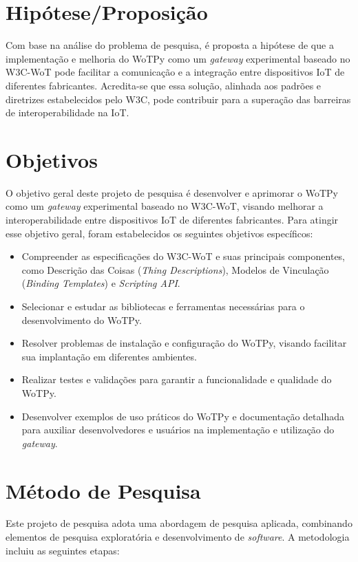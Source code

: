 \section{Hipótese/Proposição}

Com base na análise do problema de pesquisa, é proposta a hipótese de que a implementação e melhoria do WoTPy como um \textit{gateway} experimental baseado no W3C-WoT pode facilitar a comunicação e a integração entre dispositivos IoT de diferentes fabricantes. Acredita-se que essa solução, alinhada aos padrões e diretrizes estabelecidos pelo W3C, pode contribuir para a superação das barreiras de interoperabilidade na IoT.

\section{Objetivos}

O objetivo geral deste projeto de pesquisa é desenvolver e aprimorar o WoTPy como um \textit{gateway} experimental baseado no W3C-WoT, visando melhorar a interoperabilidade entre dispositivos IoT de diferentes fabricantes. Para atingir esse objetivo geral, foram estabelecidos os seguintes objetivos específicos:

\begin{itemize}
    \item Compreender as especificações do W3C-WoT e suas principais componentes, como Descrição das Coisas (\textit{Thing Descriptions}), Modelos de Vinculação (\textit{Binding Templates}) e \textit{Scripting API}.
    \item Selecionar e estudar as bibliotecas e ferramentas necessárias para o desenvolvimento do WoTPy.
    \item Resolver problemas de instalação e configuração do WoTPy, visando facilitar sua implantação em diferentes ambientes.
    \item Realizar testes e validações para garantir a funcionalidade e qualidade do WoTPy.
    \item Desenvolver exemplos de uso práticos do WoTPy e documentação detalhada para auxiliar desenvolvedores e usuários na implementação e utilização do \textit{gateway}.
\end{itemize}

\section{Método de Pesquisa}

Este projeto de pesquisa adota uma abordagem de pesquisa aplicada, combinando elementos de pesquisa exploratória e desenvolvimento de \textit{software}. A metodologia incluiu as seguintes etapas:

